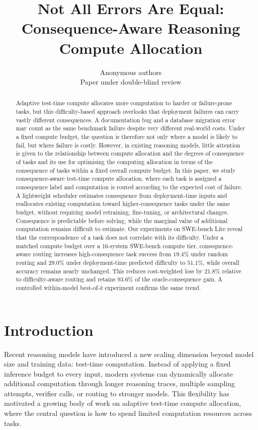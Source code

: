\documentclass{article}
\title{Not All Errors Are Equal:\\Consequence-Aware Reasoning Compute Allocation}
\author{Anonymous authors\\
Paper under double-blind review}
\begin{document}
\maketitle
\begin{abstract}
Adaptive test-time compute allocates more computation to harder or failure-prone tasks, but this difficulty-based approach overlooks that deployment failures can carry vastly different consequences. A documentation bug and a database migration error may
count as the same benchmark failure despite very different real-world
costs. 
Under a fixed compute budget, the question is therefore
not only where a model is likely to fail, but where failure is costly.
However, in existing reasoning models, little attention is given to the relationship between compute allocation and the degrees of consequence of tasks and its use for optimising the computing allocation in terms of the consequence of tasks within a fixed overall compute budget. In this paper, we study consequence-aware test-time compute allocation, where each task is assigned a consequence label and computation is routed according to the expected cost of failure. A lightweight scheduler estimates
consequence from deployment-time inputs and reallocates existing
computation toward higher-consequence tasks under the same budget,
without requiring model retraining, fine-tuning, or architectural
changes. Consequence is predictable before solving, while the marginal value of additional computation remains difficult to estimate.
Our experiments on SWE-bench Lite reveal that the correspondence of a task does not correlate with its difficulty.  Under a matched compute
budget over a 16-system SWE-bench compute tier, consequence-aware
routing increases high-consequence task success from $19.4\%$ under
random routing and $29.0\%$ under deployment-time predicted difficulty
to $51.1\%$, while overall accuracy remains nearly unchanged. This
reduces cost-weighted loss by $21.8\%$ relative to difficulty-aware
routing and retains $93.6\%$ of the oracle-consequence gain. A
controlled within-model best-of-$k$ experiment confirms the same trend.
\end{abstract}
\section{Introduction}
\label{sec:intro}

Recent reasoning models have introduced a new scaling dimension beyond
model size and training data: test-time computation. Instead of applying
a fixed inference budget to every input, modern systems can dynamically
allocate additional computation through longer reasoning traces,
multiple sampling attempts, verifier calls, or routing to stronger
models. This flexibility has motivated a growing body of work on
adaptive test-time compute allocation, where the central question is how
to spend limited computation resources across tasks.
\end{document}
